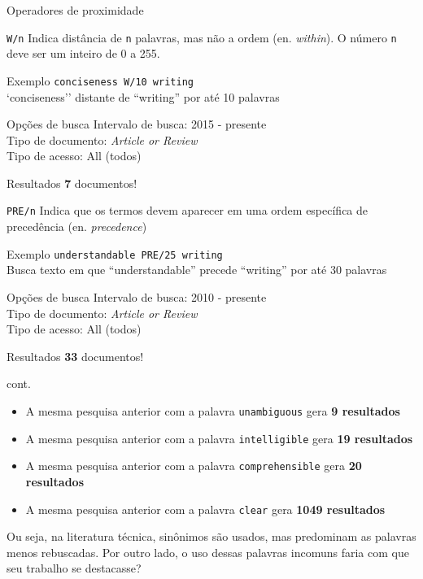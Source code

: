 \begin{frame}{Operadores de proximidade}
\begin{block}{\texttt{W/n}}
Indica distância de \texttt{n} palavras, mas não a ordem (en. \textit{within}). 
O número \texttt{n} deve ser um inteiro de 0 a 255.
\end{block}
\begin{block}{Exemplo}
\texttt{conciseness W/10 writing} \\
`conciseness'' distante de ``writing'' por até 10 palavras
\end{block}
\begin{block}{Opções de busca}
Intervalo de busca: 2015 - presente \\
Tipo de documento: \emph{Article or Review} \\
Tipo de acesso: All (todos) 
\end{block}
\begin{block}{Resultados}
\textbf{7} documentos!
\end{block}
\end{frame}

\begin{frame}{}
\begin{block}{\texttt{PRE/n}}
Indica que os termos devem aparecer em uma ordem específica de precedência (en. \textit{precedence})
\end{block}
\begin{block}{Exemplo}
\texttt{understandable PRE/25 writing} \\
Busca texto em que ``understandable'' precede ``writing'' por até 30 palavras
\end{block}
\begin{block}{Opções de busca}
Intervalo de busca: 2010 - presente \\
Tipo de documento: \emph{Article or Review} \\
Tipo de acesso: All (todos) 
\end{block}
\begin{block}{Resultados}
\textbf{33} documentos!
\end{block}
\end{frame}

\begin{frame}{cont.}
\begin{itemize}
\item A mesma pesquisa anterior com a palavra \texttt{unambiguous} gera \textbf{9 resultados}
\item A mesma pesquisa anterior com a palavra \texttt{intelligible} gera \textbf{19 resultados}
\item A mesma pesquisa anterior com a palavra \texttt{comprehensible} gera \textbf{20 resultados}
\item A mesma pesquisa anterior com a palavra \texttt{clear} gera \textbf{1049 resultados}
\end{itemize}

Ou seja, na literatura técnica, sinônimos são usados, mas predominam as palavras menos rebuscadas. Por outro lado, o uso dessas palavras incomuns faria com que seu trabalho se destacasse?
\end{frame}

